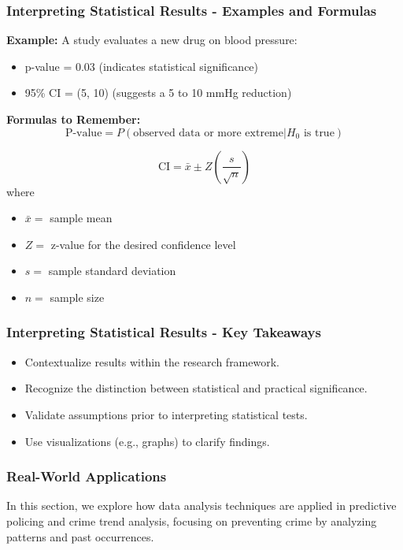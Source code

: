 \documentclass[aspectratio=169]{beamer}
\begin{document}
\begin{frame}[fragile]
    \frametitle{Interpreting Statistical Results - Examples and Formulas}
    \textbf{Example:} A study evaluates a new drug on blood pressure:
    \begin{itemize}
        \item p-value = 0.03 (indicates statistical significance)
        \item 95\% CI = (5, 10) (suggests a 5 to 10 mmHg reduction)
    \end{itemize}
    
    \textbf{Formulas to Remember:}
    \begin{equation}
        \text{P-value} = P(\text{observed data or more extreme} | H_0 \text{ is true})
    \end{equation}
    
    \begin{equation}
        \text{CI} = \bar{x} \pm Z \left( \frac{s}{\sqrt{n}} \right)
    \end{equation}
    where 
    \begin{itemize}
        \item $\bar{x} =$ sample mean
        \item $Z =$ z-value for the desired confidence level
        \item $s =$ sample standard deviation
        \item $n =$ sample size
    \end{itemize}
\end{frame}

\begin{frame}[fragile]
    \frametitle{Interpreting Statistical Results - Key Takeaways}
    \begin{itemize}
        \item Contextualize results within the research framework.
        \item Recognize the distinction between statistical and practical significance.
        \item Validate assumptions prior to interpreting statistical tests.
        \item Use visualizations (e.g., graphs) to clarify findings.
    \end{itemize}
\end{frame}

\begin{frame}[fragile]
    \frametitle{Real-World Applications}
    In this section, we explore how data analysis techniques are applied in predictive policing and crime trend analysis, focusing on preventing crime by analyzing patterns and past occurrences.
\end{frame}
\end{document}
